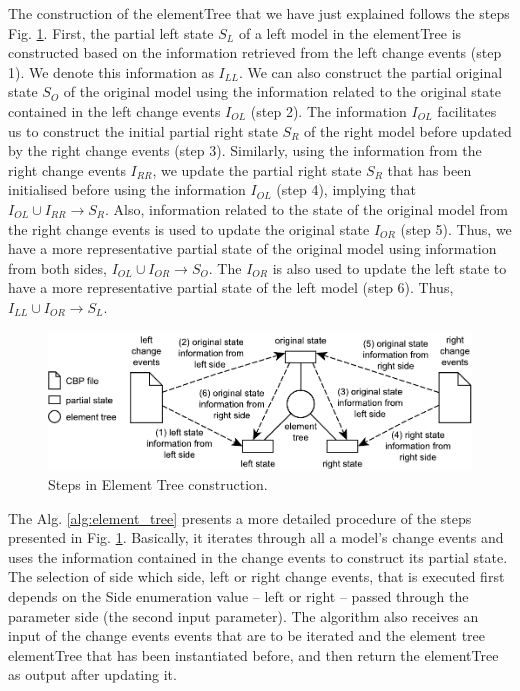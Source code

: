 \documentclass{jot}
\begin{document}
The construction of the \textsf{elementTree} that we have just explained follows the steps Fig. \ref{fig:tree_construction}. First, the partial left state $S_{L}$ of a left model in the \textsf{elementTree} is constructed based on the information retrieved from the left change events (step 1). We denote this information as $I_{LL}$. We can also construct the partial original state $S_{O}$ of the original model using the information related to the original state contained in the left change events $I_{OL}$ (step 2). The information $I_{OL}$ facilitates us to construct the initial partial right state $S_{R}$ of the right model before updated by the right change events (step 3). Similarly, using the information from the right change events $I_{RR}$, we update the partial right state $S_{R}$ that has been initialised before using the information $I_{OL}$ (step 4), implying that $I_{OL} \cup I_{RR} \rightarrow S_{R}$. Also, information related to the state of the original model from the right change events is used to update the original state $I_{OR}$ (step 5). Thus, we have a more representative partial state of the original model using information from both sides, $I_{OL} \cup I_{OR} \rightarrow S_{O}$. The $I_{OR}$ is also used to update the left state to have a more representative partial state of the left model (step 6). Thus,  $I_{LL} \cup I_{OR} \rightarrow S_{L}$.  

\begin{figure}
    \centering
    \includegraphics[width=0.7\linewidth]{TreeConstruction}
    \caption{Steps in Element Tree construction.}
    \label{fig:tree_construction}
\end{figure} 

The Alg. \ref{alg:element_tree} presents a more detailed procedure of the steps presented in Fig. \ref{fig:tree_construction}. Basically, it iterates through all a model's change events and uses the information contained in the change events to construct its partial state. The selection of side which side, left or right change events, that is executed first depends on the \textsf{Side} enumeration value -- \textsf{left} or \textsf{right} -- passed through the parameter \textsf{side} (the second input parameter). The algorithm also receives an input of the change events \textsf{events} that are to be iterated and the element tree \textsf{elementTree} that has been instantiated before, and then return the \textsf{elementTree} as output after updating it.
\end{document}
